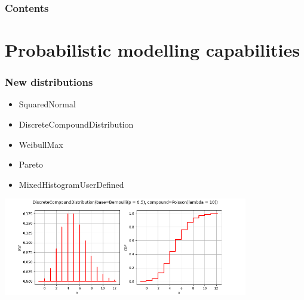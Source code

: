 \documentclass{beamer}
\begin{document}



\begin{frame}
\frametitle{Contents}
\tableofcontents
\end{frame}

\section{Probabilistic modelling capabilities}


\begin{frame}
\frametitle{New distributions}


\begin{itemize}
\item SquaredNormal
\item DiscreteCompoundDistribution
\item WeibullMax
\item Pareto
\item MixedHistogramUserDefined
\end{itemize}

\begin{center}
\includegraphics[width=0.8\textwidth]{figures/openturns-DiscreteCompoundDistribution-1.png}
\end{center}


\end{frame}
\end{document}
